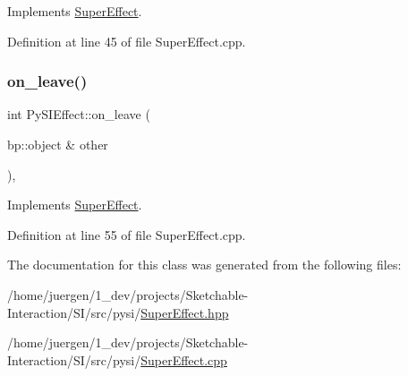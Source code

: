 Implements \mbox{\hyperlink{class_super_effect_ad742a44d394bcfde1cf8899a33713184}{Super\+Effect}}.



Definition at line 45 of file Super\+Effect.\+cpp.

\mbox{\label{class_py_s_i_effect_ae5d044faa5644ece384d9907132076a1}} 
\subsubsection{\texorpdfstring{on\_leave()}{on\_leave()}}
{\footnotesize\ttfamily int Py\+S\+I\+Effect\+::on\+\_\+leave (\begin{DoxyParamCaption}\item[{bp\+::object \&}]{other }\end{DoxyParamCaption})\hspace{0.3cm}{\ttfamily [override]}, {\ttfamily [virtual]}}



Implements \mbox{\hyperlink{class_super_effect_a5f8e89f4930f8f47da22994d0a1b1a61}{Super\+Effect}}.



Definition at line 55 of file Super\+Effect.\+cpp.



The documentation for this class was generated from the following files\+:\begin{DoxyCompactItemize}
\item 
/home/juergen/1\+\_\+dev/projects/\+Sketchable-\/\+Interaction/\+S\+I/src/pysi/\mbox{\hyperlink{_super_effect_8hpp}{Super\+Effect.\+hpp}}\item 
/home/juergen/1\+\_\+dev/projects/\+Sketchable-\/\+Interaction/\+S\+I/src/pysi/\mbox{\hyperlink{_super_effect_8cpp}{Super\+Effect.\+cpp}}\end{DoxyCompactItemize}
